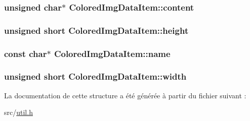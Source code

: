 \subsubsection[{content}]{\setlength{\rightskip}{0pt plus 5cm}unsigned char$\ast$ Colored\+Img\+Data\+Item\+::content}\label{struct_colored_img_data_item_a0f81eed6cfa6792cfa3d6bf9d4e40faa}
\hypertarget{struct_colored_img_data_item_acfac94346e3f7837df12c487bce866f2}{}
\subsubsection[{height}]{\setlength{\rightskip}{0pt plus 5cm}unsigned short Colored\+Img\+Data\+Item\+::height}\label{struct_colored_img_data_item_acfac94346e3f7837df12c487bce866f2}
\hypertarget{struct_colored_img_data_item_afed2ef0f30516caf6b81a9d41033c8f3}{}
\subsubsection[{name}]{\setlength{\rightskip}{0pt plus 5cm}const char$\ast$ Colored\+Img\+Data\+Item\+::name}\label{struct_colored_img_data_item_afed2ef0f30516caf6b81a9d41033c8f3}
\hypertarget{struct_colored_img_data_item_aebc8ef167c7bbdf928fcc59b3c9d436b}{}
\subsubsection[{width}]{\setlength{\rightskip}{0pt plus 5cm}unsigned short Colored\+Img\+Data\+Item\+::width}\label{struct_colored_img_data_item_aebc8ef167c7bbdf928fcc59b3c9d436b}


La documentation de cette structure a été générée à partir du fichier suivant \+:\begin{DoxyCompactItemize}
\item 
src/\hyperlink{util_8h}{util.\+h}\end{DoxyCompactItemize}
